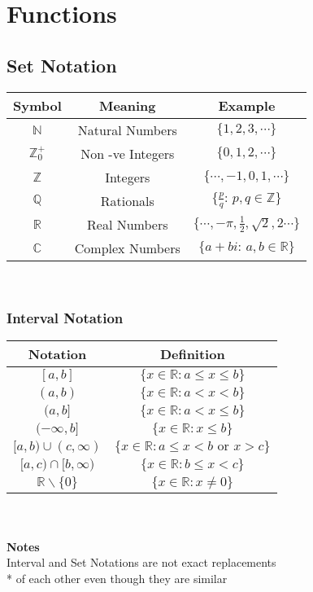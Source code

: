 \documentclass[../main.tex]{subfiles}
\begin{document}
\section{Functions}

\subsection{Set Notation}
\begin{tabular}{|c|c|c|}
    \hline
    \textbf{Symbol} & \textbf{Meaning} & \textbf{Example} \\
    \hline
    \(\mathbb{N}\) & Natural Numbers & \(\{1,2,3, \cdots\}\) \\
    \hline
    \(\mathbb{Z}^{+}_{0}\) & Non -ve Integers & \(\{0,1,2, \cdots\}\) \\
    \hline
    \(\mathbb{Z}\) & Integers & \(\{\cdots ,-1,0,1, \cdots\}\) \\
    \hline
    \(\mathbb{Q}\) & Rationals & \(\{\frac{p}{q} : \, p,q \in \mathbb{Z}\}\) \\
    \hline
    \(\mathbb{R}\) & Real Numbers & \(\{\cdots, -\pi, \frac{1}{2}, \sqrt{2}, 2 \cdots\}\) \\
    \hline
    \(\mathbb{C}\) & Complex Numbers & \(\{a+bi : \, a,b \in \mathbb{R}\}\) \\
    \hline
\end{tabular} \\

\subsubsection{Interval Notation}
\begin{tabular}{|c|c|}
    \hline
    \textbf{Notation} & \textbf{Definition} \\
    \hline
    \([a,b]\) & \(\{x\in\mathbb{R} : a \leq x \leq b\}\) \\
    \hline
    \((a,b)\) & \(\{x\in\mathbb{R} : a < x < b\}\) \\
    \hline
    \((a,b]\) & \(\{x\in\mathbb{R} : a < x \leq b\}\) \\
    \hline
    \((-\infty,b]\) & \(\{x\in\mathbb{R} : x \leq b\}\) \\
    \hline
    \([a,b) \cup (c,\infty)\) & \(\{x\in\mathbb{R} : a \leq x < b \text{ or } x > c\}\) \\
    \hline
    \([a,c) \cap [b,\infty)\) & \(\{x\in\mathbb{R} : b \leq x < c\}\) \\
    \hline
    \(\mathbb{R}\backslash\{0\}\) & \(\{x\in\mathbb{R} : x \neq 0\}\) \\
    \hline
\end{tabular} \\\\
\textbf{Notes} \\
Interval and Set Notations are not exact replacements \\* of each other even though they are similar
\end{document}
